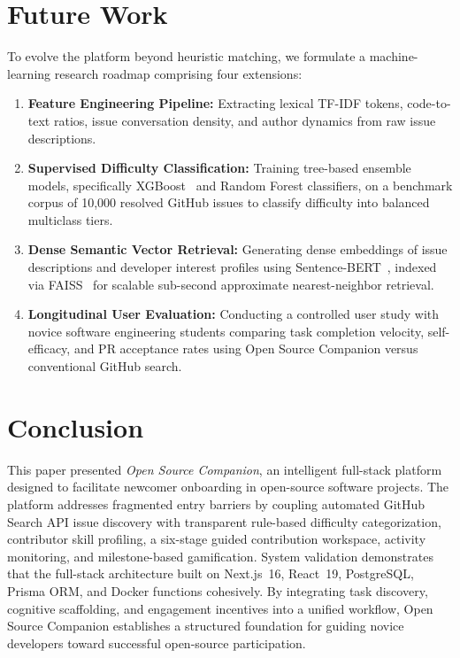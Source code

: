 \documentclass[conference]{IEEEtran}
\begin{document}
\section{Future Work}
To evolve the platform beyond heuristic matching, we formulate a machine-learning research roadmap comprising four extensions:
\begin{enumerate}
    \item \textbf{Feature Engineering Pipeline:} Extracting lexical TF-IDF tokens, code-to-text ratios, issue conversation density, and author dynamics from raw issue descriptions.
    \item \textbf{Supervised Difficulty Classification:} Training tree-based ensemble models, specifically XGBoost~\cite{chen2016xgboost} and Random Forest classifiers, on a benchmark corpus of 10,000 resolved GitHub issues to classify difficulty into balanced multiclass tiers.
    \item \textbf{Dense Semantic Vector Retrieval:} Generating dense embeddings of issue descriptions and developer interest profiles using Sentence-BERT~\cite{reimers2019sentence}, indexed via FAISS~\cite{johnson2021billion} for scalable sub-second approximate nearest-neighbor retrieval.
    \item \textbf{Longitudinal User Evaluation:} Conducting a controlled user study with novice software engineering students comparing task completion velocity, self-efficacy, and PR acceptance rates using Open Source Companion versus conventional GitHub search.
\end{enumerate}

\section{Conclusion}
This paper presented \textit{Open Source Companion}, an intelligent full-stack platform designed to facilitate newcomer onboarding in open-source software projects. The platform addresses fragmented entry barriers by coupling automated GitHub Search API issue discovery with transparent rule-based difficulty categorization, contributor skill profiling, a six-stage guided contribution workspace, activity monitoring, and milestone-based gamification. System validation demonstrates that the full-stack architecture built on Next.js~16, React~19, PostgreSQL, Prisma ORM, and Docker functions cohesively. By integrating task discovery, cognitive scaffolding, and engagement incentives into a unified workflow, Open Source Companion establishes a structured foundation for guiding novice developers toward successful open-source participation.



\end{document}
